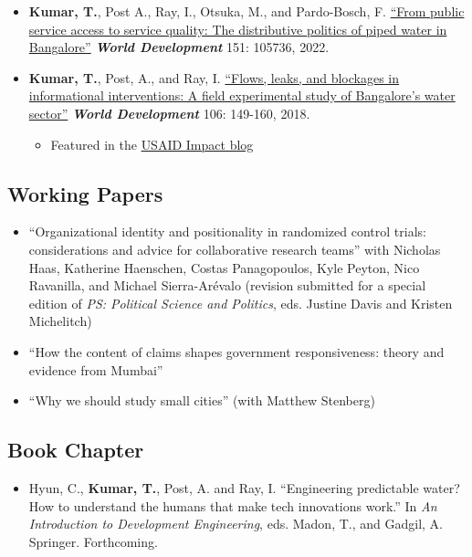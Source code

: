 \documentclass[11pt]{article}
\begin{document}
\begin{itemize}
\begin{itemize}
\end{itemize}

		\item[] \textbf{Kumar, T.}, Post A., Ray, I., Otsuka, M., and Pardo-Bosch, F. \href{https://doi.org/10.1016/j.worlddev.2021.105736}{``From public service access to service quality: The distributive politics of piped water in Bangalore''} \textbf{\textit{World Development}} 151: 105736, 2022.

		\item[] \textbf{Kumar, T.}, Post, A., and Ray, I. \href{https://www.sciencedirect.com/science/article/pii/S0305750X1830032}{``Flows, leaks, and blockages in informational interventions: A field experimental study of Bangalore's water sector''} \textit{\textbf{World Development} }106: 149-160, 2018.
		\begin{itemize}[nosep]
		\item Featured in the \href{https://blog.usaid.gov/2016/05/using-mobile-phones-to-alert-households-waiting-for-nextdrop-of-water/}{USAID Impact blog}
		\end{itemize}
		

\end{itemize}

\subsection*{Working Papers}

\begin{itemize}




	

	\item[]``Organizational identity and positionality in randomized control trials: considerations and advice for collaborative research teams'' with Nicholas Haas, Katherine Haenschen, Costas Panagopoulos, Kyle Peyton, Nico Ravanilla, and Michael  Sierra-Ar\'{e}valo (revision submitted for a special edition of \textit{PS: Political Science and Politics}, eds. Justine Davis and Kristen Michelitch)
		

	\item[]``How the content of claims shapes government responsiveness: theory and evidence from Mumbai'' 
	\item[]``Why we should study small cities'' (with Matthew Stenberg)		

\end{itemize}

\subsection*{Book Chapter}
\begin{itemize}
	\item[]Hyun, C., \textbf{Kumar, T.}, Post, A. and Ray, I. ``Engineering predictable water? How to understand the humans that make tech innovations work.'' In \textit{An Introduction to Development Engineering}, eds. Madon, T., and Gadgil, A. Springer. Forthcoming.


	\end{itemize}
	
\end{document}
